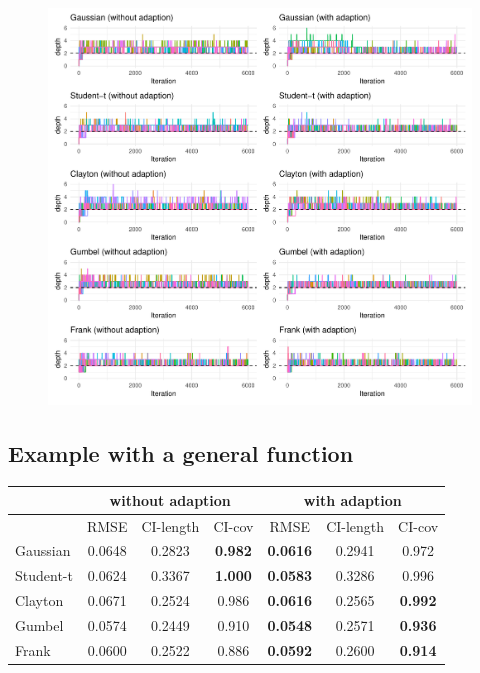 \documentclass{amsart}
\begin{document}
\begin{figure}
	\centering
	\includegraphics[width = 0.95\linewidth]{"case_1_depth.pdf"}
\end{figure}

\subsection{Example with a general function}

\begin{table}[ht]
	\centering
	\begin{tabular}{l|ccc|ccc}
		\toprule
		\multicolumn{1}{c|}{} &
		\multicolumn{3}{c|}{without adaption} &
		\multicolumn{3}{c}{with adaption} \\
		\midrule
		& RMSE & CI-length & CI-cov & RMSE & CI-length & CI-cov \\ 
		\midrule
		Gaussian & 0.0648 & 0.2823 & \textbf{0.982} & \textbf{0.0616} & 0.2941 & 0.972 \\ 
		Student-t & 0.0624 & 0.3367 & \textbf{1.000} & \textbf{0.0583} & 0.3286 & 0.996 \\ 
		Clayton & 0.0671 & 0.2524 & 0.986 & \textbf{0.0616} & 0.2565 & \textbf{0.992} \\ 
		Gumbel & 0.0574 & 0.2449 & 0.910 & \textbf{0.0548} & 0.2571 & \textbf{0.936} \\ 
		Frank & 0.0600 & 0.2522 & 0.886 & \textbf{0.0592} & 0.2600 & \textbf{0.914} \\ 
		\hline
	\end{tabular}
\end{table}
\end{document}
